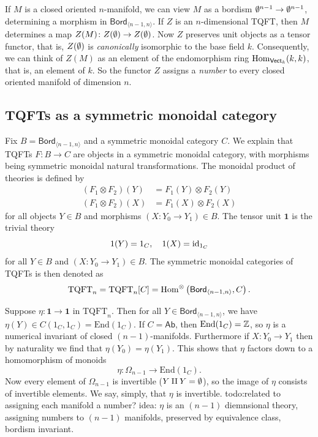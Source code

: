 \begin{remark}
    If $M$ is a closed oriented $n$-manifold, we can view $M$ as a bordism $\emptyset^{n-1}\to \emptyset^{n-1}$, determining a morphism in $\mathsf{Bord} _{\langle n-1,n \rangle }$. If $Z$ is an $n$-dimensional TQFT, then $M$ determines a map $Z(M) \colon Z(\emptyset) \to Z(\emptyset)$. Now $Z$ preserves unit objects as a tensor functor, that is, $Z(\emptyset)$ is \emph{canonically} isomorphic to the base field $k$. Consequently, we can think of $Z(M)$ as an element of the endomorphism ring $\operatorname{Hom} _{\mathsf{Vect} _k}(k,k)$, that is, an element of $k$. So the functor $Z$ assigns a \emph{number} to every closed oriented manifold of dimension $n$.
\end{remark}

\subsection{TQFTs as a symmetric monoidal category}
Fix $B= \mathsf{Bord} _{\langle n-1,n \rangle }$ and a symmetric monoidal category $C$. We explain that TQFTs $F \colon B \to C$ are objects in a symmetric monoidal category, with morphisms being symmetric monoidal natural transformations. The monoidal product of theories is defined by 
\begin{align*}
    (F_1 \otimes F_2)(Y) &= F_1(Y) \otimes F_2(Y) \\
    (F_1 \otimes F_2)(X) &= F_1(X) \otimes F_2(X)
\end{align*}for all objects $Y \in B$ and morphisms $(X \colon Y_0 \to Y_1) \in B$. The tensor unit $\mathbf 1$ is the trivial theory \[
1(Y)=1_C, \quad 1(X)=\operatorname{id}_{1_C}
\] for all $Y \in B$ and $(X \colon Y_0 \to Y_1) \in B$. The symmetric monoidal categories of TQFTs is then denoted as \[
\mathrm{TQFT}_n =\mathrm{TQFT}_n [C]=\operatorname{Hom} ^{\otimes}\left( \mathsf{Bord} _{\langle n-1,n \rangle },C \right) .
\] 
\begin{example}
    Suppose $\eta \colon \mathbf 1 \to \mathbf 1$ in $\mathrm{TQFT}_n $. Then for all $Y \in \mathsf{Bord} _{\langle n-1,n \rangle }$, we have $\eta(Y) \in  C(1_C,1_C) = \mathrm{End}(1_C)$. If $C= \mathsf{Ab} $, then $\mathrm{End}(1_C)= \mathbb{Z}$, so $\eta$ is a numerical invariant of closed $(n-1)$-manifolds. Furthermore if $X \colon Y_0 \to Y_1$ then by naturality we find that $\eta(Y_0)=\eta(Y_1)$. This shows that $\eta$ factors down to a homomorphism of monoids \[
        \eta \colon \Omega_{n-1}  \to \mathrm{End}(1_C).
    \] Now every element of $\Omega_{n-1}$ is invertible ($Y\amalg Y=\emptyset$), so the image of $\eta$ consists of invertible elements. We say, simply, that $\eta$ is invertible. {\color{red}todo:related to assigning each manifold a number?} idea: $\eta $ is an $(n-1)$ diemnsional theory, assigning numbers to $(n-1)$ manifolds, preserved by equivalence class, bordism invariant.
\end{example}

